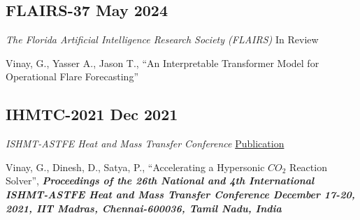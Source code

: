 \subsection{FLAIRS-37 \hfill May 2024}
{\textit{The Florida Artificial Intelligence Research Society (FLAIRS)} \hfill {In Review}}
\begin{zitemize}
\item {Vinay, G., Yasser A., Jason T., ``An Interpretable Transformer Model for Operational Flare Forecasting''}
\end{zitemize}

\subsection{IHMTC-2021 \hfill Dec 2021}
{\textit{ISHMT-ASTFE Heat and Mass Transfer Conference} \hfill \href{https://www.dl.begellhouse.com/references/486d924a7e5ad8c3,393f7ffc7879d8ca,2aa0e4f13f8adbd7.html}{Publication}}
\begin{zitemize}
\item {Vinay, G., Dinesh, D., Satya, P., ``Accelerating a Hypersonic $CO_2$ Reaction Solver'', \textit{\textbf{Proceedings of the 26th National and 4th International ISHMT-ASTFE Heat and Mass Transfer Conference December 17-20, 2021, IIT Madras, Chennai-600036, Tamil Nadu, India}}}
\end{zitemize}

